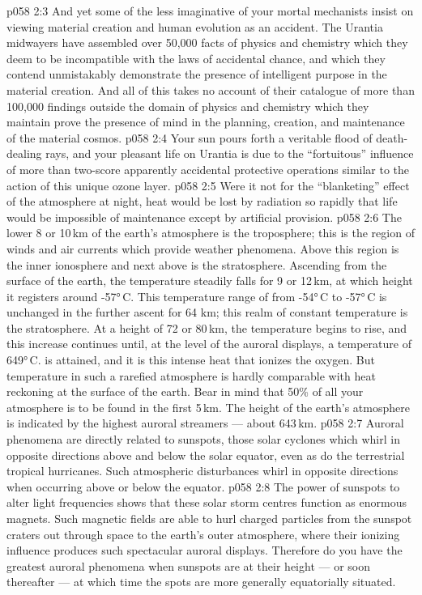 \vs p058 2:3 And yet some of the less imaginative of your mortal mechanists insist on viewing material creation and human evolution as an accident. The Urantia midwayers have assembled over 50,000 facts of physics and chemistry which they deem to be incompatible with the laws of accidental chance, and which they contend unmistakably demonstrate the presence of intelligent purpose in the material creation. And all of this takes no account of their catalogue of more than 100,000 findings outside the domain of physics and chemistry which they maintain prove the presence of mind in the planning, creation, and maintenance of the material cosmos.
\vs p058 2:4 Your sun pours forth a veritable flood of death\hyp{}dealing rays, and your pleasant life on Urantia is due to the “fortuitous” influence of more than two\hyp{}score apparently accidental protective operations similar to the action of this unique ozone layer.
\vs p058 2:5 Were it not for the “blanketing” effect of the atmosphere at night, heat would be lost by radiation so rapidly that life would be impossible of maintenance except by artificial provision.
\vs p058 2:6 \pc The lower 8 or 10\,km of the earth’s atmosphere is the troposphere; this is the region of winds and air currents which provide weather phenomena. Above this region is the inner ionosphere and next above is the stratosphere. Ascending from the surface of the earth, the temperature steadily falls for 9 or 12\,km, at which height it registers around \mbox{-57°\,C}. This temperature range of from \mbox{-54°\,C} to \mbox{-57°\,C} is unchanged in the further ascent for 64 km; this realm of constant temperature is the stratosphere. At a height of 72 or 80\,km, the temperature begins to rise, and this increase continues until, at the level of the auroral displays, a temperature of 649°\,C. is attained, and it is this intense heat that ionizes the oxygen. But temperature in such a rarefied atmosphere is hardly comparable with heat reckoning at the surface of the earth. Bear in mind that 50\% of all your atmosphere is to be found in the first 5\,km. The height of the earth’s atmosphere is indicated by the highest auroral streamers --- about 643\,km.
\vs p058 2:7 Auroral phenomena are directly related to sunspots, those solar cyclones which whirl in opposite directions above and below the solar equator, even as do the terrestrial tropical hurricanes. Such atmospheric disturbances whirl in opposite directions when occurring above or below the equator.
\vs p058 2:8 The power of sunspots to alter light frequencies shows that these solar storm centres function as enormous magnets. Such magnetic fields are able to hurl charged particles from the sunspot craters out through space to the earth’s outer atmosphere, where their ionizing influence produces such spectacular auroral displays. Therefore do you have the greatest auroral phenomena when sunspots are at their height --- or soon thereafter --- at which time the spots are more generally equatorially situated.
